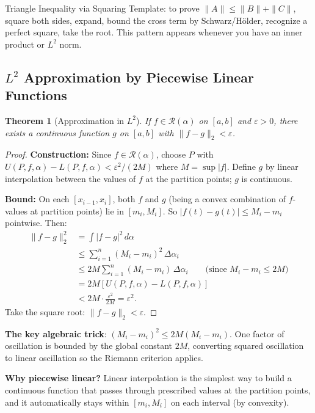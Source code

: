 \documentclass[11pt]{article}
\newcommand{\eps}{\varepsilon}
\theoremstyle{myplain}
\newtheorem{theorem}{Theorem}[section]
\theoremstyle{definition}
\theoremstyle{remark}
\begin{document}
\begin{technique}{Triangle Inequality via Squaring}
Template: to prove $\|A\| \leq \|B\| + \|C\|$, square both sides, expand, bound the cross term by Schwarz/Hölder, recognize a perfect square, take the root. This pattern appears whenever you have an inner product or $L^2$ norm.
\end{technique}

\subsection{$L^2$ Approximation by Piecewise Linear Functions}

\begin{theorem}[Approximation in $L^2$]
If $f \in \mathscr{R}(\alpha)$ on $[a,b]$ and $\eps > 0$, there exists a continuous function $g$ on $[a,b]$ with $\|f - g\|_2 < \eps$.
\end{theorem}

\begin{proof}[Proof]
\textbf{Construction:} Since $f \in \mathscr{R}(\alpha)$, choose $P$ with $U(P,f,\alpha) - L(P,f,\alpha) < \eps^2/(2M)$ where $M = \sup|f|$. Define $g$ by linear interpolation between the values of $f$ at the partition points; $g$ is continuous.

\textbf{Bound:} On each $[x_{i-1},x_i]$, both $f$ and $g$ (being a convex combination of $f$-values at partition points) lie in $[m_i, M_i]$. So $|f(t) - g(t)| \leq M_i - m_i$ pointwise. Then:
\begin{align*}
\|f-g\|_2^2 &= \int |f-g|^2\,d\alpha \\
&\leq \sum_{i=1}^n (M_i - m_i)^2\,\Delta\alpha_i \\
&\leq 2M\sum_{i=1}^n (M_i - m_i)\,\Delta\alpha_i \qquad \text{(since $M_i - m_i \leq 2M$)} \\
&= 2M[U(P,f,\alpha) - L(P,f,\alpha)] \\
&< 2M \cdot \frac{\eps^2}{2M} = \eps^2.
\end{align*}
Take the square root: $\|f-g\|_2 < \eps$.
\end{proof}

\begin{insight}
\textbf{The key algebraic trick}: $(M_i - m_i)^2 \leq 2M(M_i - m_i)$. One factor of oscillation is bounded by the global constant $2M$, converting squared oscillation to linear oscillation so the Riemann criterion applies.

\textbf{Why piecewise linear?} Linear interpolation is the simplest way to build a continuous function that passes through prescribed values at the partition points, and it automatically stays within $[m_i, M_i]$ on each interval (by convexity).
\end{insight}
\end{document}
